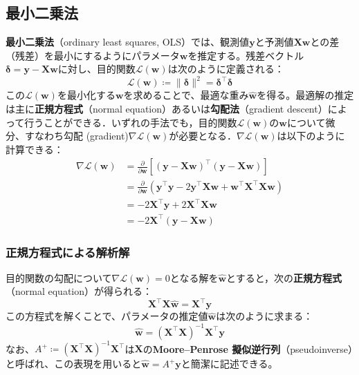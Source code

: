 \subsection{最小二乗法}
\textbf{最小二乗法}（ordinary least squares, OLS）では、観測値$\mathbf{y}$と予測値$\mathbf{Xw}$との差（残差）を最小にするようにパラメータ$\mathbf{w}$を推定する。残差ベクトル$\boldsymbol{\delta} = \mathbf{y} - \mathbf{Xw}$に対し、目的関数$\mathcal{L}(\mathbf{w})$は次のように定義される：
\begin{equation}
\mathcal{L}(\mathbf{w}) \coloneqq \|\boldsymbol{\delta}\|^2 = \boldsymbol{\delta}^\top \boldsymbol{\delta}
\end{equation}
この$\mathcal{L}(\mathbf{w})$を最小化する$\mathbf{w}$を求めることで、最適な重み$\hat{\mathbf{w}}$を得る。最適解の推定は主に\textbf{正規方程式}（normal equation）あるいは\textbf{勾配法}（gradient descent）によって行うことができる．いずれの手法でも，目的関数$\mathcal{L}(\mathbf{w})$の$\mathbf{w}$について微分、すなわち勾配 (gradient)$\nabla \mathcal{L}(\mathbf{w})$が必要となる．$\nabla \mathcal{L}(\mathbf{w})$は以下のように計算できる：
\begin{align}
\nabla \mathcal{L}(\mathbf{w})
&= \frac{\partial}{\partial \mathbf{w}}\left[(\mathbf{y} - \mathbf{Xw})^\top (\mathbf{y} - \mathbf{Xw}) \right] \\
&= \frac{\partial}{\partial \mathbf{w}} \left( \mathbf{y}^\top \mathbf{y} - 2 \mathbf{y}^\top \mathbf{Xw} + \mathbf{w}^\top \mathbf{X}^\top \mathbf{Xw} \right) \\
&= -2 \mathbf{X}^\top \mathbf{y} + 2 \mathbf{X}^\top \mathbf{Xw}\\
&= -2\mathbf{X}^\top (\mathbf{y} - \mathbf{Xw})
\end{align}
\subsubsection{正規方程式による解析解}
目的関数の勾配について$\nabla \mathcal{L}(\mathbf{w})=0$となる解を$\hat{\mathbf{w}}$とすると，次の\textbf{正規方程式}（normal equation）が得られる：
\begin{equation}
\mathbf{X}^\top \mathbf{X} \hat{\mathbf{w}} = \mathbf{X}^\top \mathbf{y}
\end{equation}
この方程式を解くことで、パラメータの推定値$\hat{\mathbf{w}}$は次のように求まる：
\begin{equation}
\hat{\mathbf{w}} = (\mathbf{X}^\top \mathbf{X})^{-1} \mathbf{X}^\top \mathbf{y}
\end{equation}
なお、$A^+ \coloneqq (\mathbf{X}^\top \mathbf{X})^{-1} \mathbf{X}^\top$は$\mathbf{X}$の\textbf{Moore–Penrose 擬似逆行列}（pseudoinverse）と呼ばれ、この表現を用いると$\hat{\mathbf{w}} = A^+ \mathbf{y}$と簡潔に記述できる。
